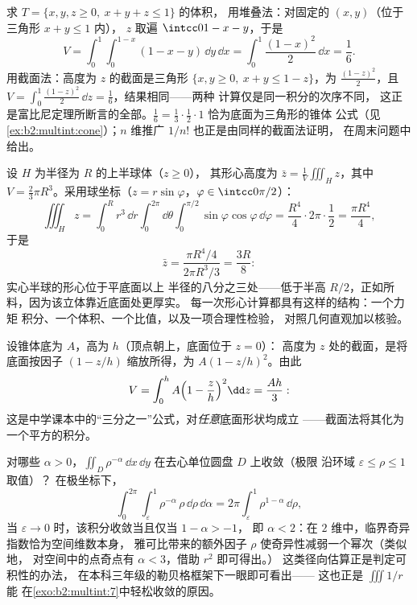 \begin{example}[四面体的两次计算]
\label{ex:b2:multint:tetra}
求 $T = \{x, y, z \geq 0,\ x + y + z \leq 1\}$ 的体积，
用堆叠法：对固定的 $(x, y)$（位于三角形 $x + y \leq 1$ 内），
$z$ 取遍 $\intcc0{1 - x - y}$，于是
\[
V = \int_0^1\!\!\int_0^{1-x}(1 - x - y)\,\dd y\,\dd x
= \int_0^1\frac{(1 - x)^2}{2}\,\dd x = \frac16 .
\]
用截面法：高度为 $z$ 的截面是三角形 $\{x, y
\geq 0,\ x + y \leq 1 - z\}$，为 $\frac{(1-z)^2}2$，且
$V = \int_0^1\frac{(1-z)^2}2\,\dd z = \frac16$，结果相同——两种
计算仅是同一积分的次序不同，
这正是富比尼定理所断言的全部。$\frac16 =
\frac13\cdot\frac12\cdot1$ 恰为底面为三角形的锥体
公式（见\cref{ex:b2:multint:cone}）；$n$ 维推广 $1/n!$
也正是由同样的截面法证明，
在周末问题中给出。
\end{example}

\begin{example}[半球体的形心]\label{ex:b2:multint:centroid}
设 $H$ 为半径为 $R$ 的上半球体（$z \geq 0$），
其形心高度为 $\bar z = \frac1{V}\iiint_H z$，其中 $V =
\frac23\pi R^3$。采用球坐标（$z =
r\sin\varphi$，$\varphi \in \intcc0{\pi/2}$）：
\[
\iiint_H z
= \int_0^R r^3\,\dd r\int_0^{2\pi}\dd\theta
\int_0^{\pi/2}\sin\varphi\cos\varphi\,\dd\varphi
= \frac{R^4}4\cdot2\pi\cdot\frac12 = \frac{\pi R^4}4 ,
\]
于是
\[
\bar z = \frac{\pi R^4/4}{2\pi R^3/3} = \frac{3R}8 :
\]
实心半球的形心位于平底面以上
半径的八分之三处——低于半高
$R/2$，正如所料，因为该立体靠近底面处更厚实。
每一次形心计算都具有这样的结构：一个力矩
积分、一个体积、一个比值，以及一项合理性检验，
对照几何直观加以核验。
\end{example}

\begin{example}[用截面法求体积：锥体]\label{ex:b2:multint:cone}
设锥体底为 $A$，高为 $h$（顶点朝上，底面位于 $z = 0$）：
高度为 $z$ 处的截面，是将底面按因子 $(1 -
z/h)$ 缩放所得，为 $A(1 - z/h)^2$。由此
\[
V = \int_0^h A\Bigl(1 - \frac zh\Bigr)^2\dd z = \frac{Ah}{3} :
\]
这是中学课本中的“三分之一”公式，对\emph{任意}底面形状均成立
——截面法将其化为一个平方的积分。
\end{example}

\begin{example}\label{ex:b2:multint:threshold}
对哪些 $\alpha > 0$，$\iint_{D}\rho^{-\alpha}\,\dd
x\,\dd y$ 在去心单位圆盘 $D$ 上收敛（极限
沿环域 $\varepsilon \leq \rho \leq 1$ 取值）？
在极坐标下，
\[
\int_0^{2\pi}\!\!\int_\varepsilon^1\rho^{-\alpha}\,
\rho\,\dd\rho\,\dd\alpha
= 2\pi\int_\varepsilon^1\rho^{1-\alpha}\,\dd\rho ,
\]
当 $\varepsilon \to 0$ 时，该积分收敛当且仅当 $1 - \alpha > -1$，
即 $\alpha < 2$：在 $2$ 维中，临界奇异指数恰为空间维数本身，
雅可比带来的额外因子 $\rho$
使奇异性减弱一个幂次（类似地，
对空间中的点奇点有 $\alpha < 3$，借助 $r^2$ 即可得出。）
这类径向估算正是判定可积性的办法，
在本科三年级的勒贝格框架下一眼即可看出——
这也正是 $\iiint 1/r$ 能
在\cref{exo:b2:multint:7}中轻松收敛的原因。
\end{example}

